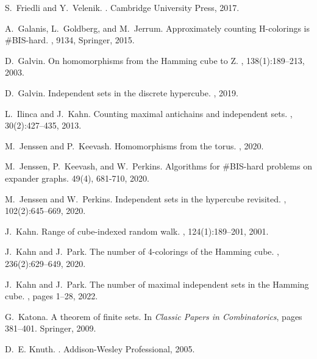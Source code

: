 \documentclass{amsart}
\theoremstyle{definition}
\newcommand{\0}[0]{\emptyset}
\begin{document}
\begin{thebibliography}{10}
S.~Friedli and Y.~Velenik.
.
\newblock Cambridge University Press, 2017.

A.~Galanis, L.~Goldberg, and M.~Jerrum.
\newblock  Approximately counting H-colorings is \#BIS-hard.
, 9134, Springer, 2015.

D.~Galvin.
\newblock On homomorphisms from the {H}amming cube to {Z}.
, 138(1):189--213, 2003.

D.~Galvin.
\newblock Independent sets in the discrete hypercube.
, 2019.

L.~Ilinca and J.~Kahn.
\newblock Counting maximal antichains and independent sets.
, 30(2):427--435, 2013.

M.~Jenssen and P.~Keevash.
\newblock Homomorphisms from the torus.
, 2020.

M.~Jenssen, P.~Keevash, and W.~Perkins.
\newblock Algorithms for \#BIS-hard problems on expander graphs.
 49(4), 681-710, 2020.

M.~Jenssen and W.~Perkins.
\newblock Independent sets in the hypercube revisited.
, 102(2):645--669,
  2020.

J.~Kahn.
\newblock Range of cube-indexed random walk.
, 124(1):189--201, 2001.

J.~Kahn and J.~Park.
\newblock The number of 4-colorings of the {H}amming cube.
, 236(2):629--649, 2020.

J.~Kahn and J.~Park.
\newblock The number of maximal independent sets in the {H}amming cube.
, pages 1--28, 2022.

G.~Katona.
\newblock A theorem of finite sets.
\newblock In {\em Classic Papers in Combinatorics}, pages 381--401. Springer,
  2009.

D.~E. Knuth.
.
\newblock Addison-Wesley Professional, 2005.


\end{thebibliography}
\end{document}
